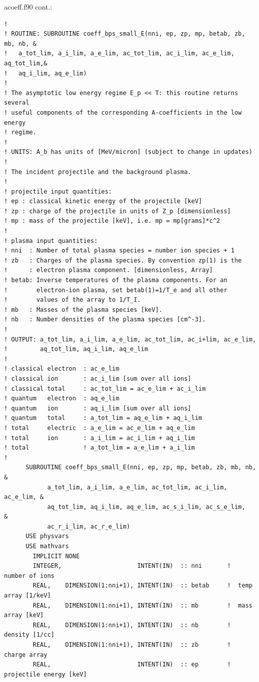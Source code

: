 \documentclass[preprint,12pt,eqsecnum,nofootinbib,amsmath,amssymb]{revtex4}
\begin{document}
\vskip1cm 
\noindent
acoeff.f90 cont.:
{
\baselineskip 10pt
\begin{verbatim}
! 
! ROUTINE: SUBROUTINE coeff_bps_small_E(nni, ep, zp, mp, betab, zb, mb, nb, &
!   a_tot_lim, a_i_lim, a_e_lim, ac_tot_lim, ac_i_lim, ac_e_lim, aq_tot_lim,&
!   aq_i_lim, aq_e_lim)
!
! The asymptotic low energy regime E_p << T: this routine returns several 
! useful components of the corresponding A-coefficients in the low energy
! regime.
!
! UNITS: A_b has units of [MeV/micron] (subject to change in updates)
!
! The incident projectile and the background plasma. 
!
! projectile input quantities:
! ep : classical kinetic energy of the projectile [keV]
! zp : charge of the projectile in units of Z_p [dimensionless]
! mp : mass of the projectile [keV], i.e. mp = mp[grams]*c^2
!
! plasma input quantities:
! nni  : Number of total plasma species = number ion species + 1
! zb   : Charges of the plasma species. By convention zp(1) is the 
!      : electron plasma component. [dimensionless, Array]
! betab: Inverse temperatures of the plasma components. For an
!        electron-ion plasma, set betab(1)=1/T_e and all other
!        values of the array to 1/T_I.
! mb   : Masses of the plasma species [keV]. 
! nb   : Number densities of the plasma species [cm^-3]. 
!
! OUTPUT: a_tot_lim, a_i_lim, a_e_lim, ac_tot_lim, ac_i+lim, ac_e_lim, 
!         aq_tot_lim, aq_i_lim, aq_e_lim
!
! classical electron  : ac_e_lim
! classical ion       : ac_i_lim [sum over all ions]
! classical total     : ac_tot_lim = ac_e_lim + ac_i_lim 
! quantum   electron  : aq_e_lim
! quantum   ion       : aq_i_lim [sum over all ions]
! quantum   total     : a_tot_lim = aq_e_lim + aq_i_lim
! total     electric  : a_e_lim = ac_e_lim + aq_e_lim
! total     ion       : a_i_lim = ac_i_lim + aq_i_lim
! total               ! a_tot_lim = a_e_lim + a_i_lim
!
      SUBROUTINE coeff_bps_small_E(nni, ep, zp, mp, betab, zb, mb, nb,   &
            a_tot_lim, a_i_lim, a_e_lim, ac_tot_lim, ac_i_lim, ac_e_lim, &
            aq_tot_lim, aq_i_lim, aq_e_lim, ac_s_i_lim, ac_s_e_lim,      &
            ac_r_i_lim, ac_r_e_lim)
      USE physvars
      USE mathvars      
        IMPLICIT NONE
        INTEGER,                     INTENT(IN)  :: nni       !  number of ions
        REAL,    DIMENSION(1:nni+1), INTENT(IN)  :: betab     !  temp array [1/keV]
        REAL,    DIMENSION(1:nni+1), INTENT(IN)  :: mb        !  mass array [keV]
        REAL,    DIMENSION(1:nni+1), INTENT(IN)  :: nb        !  density [1/cc]
        REAL,    DIMENSION(1:nni+1), INTENT(IN)  :: zb        !  charge array
        REAL,                        INTENT(IN)  :: ep        !  projectile energy [keV]

\end{verbatim}}
\end{document}
